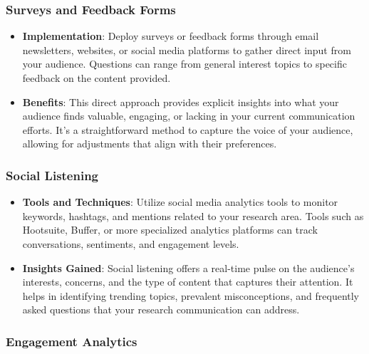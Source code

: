 \documentclass[
]{book}
\providecommand{\tightlist}{%
  \setlength{\itemsep}{0pt}\setlength{\parskip}{0pt}}
\begin{document}
\hypertarget{surveys-and-feedback-forms}{%
\subsubsection*{Surveys and Feedback Forms}\label{surveys-and-feedback-forms}}

\begin{itemize}
\tightlist
\item
  \textbf{Implementation}: Deploy surveys or feedback forms through email newsletters, websites, or social media platforms to gather direct input from your audience. Questions can range from general interest topics to specific feedback on the content provided.
\item
  \textbf{Benefits}: This direct approach provides explicit insights into what your audience finds valuable, engaging, or lacking in your current communication efforts. It's a straightforward method to capture the voice of your audience, allowing for adjustments that align with their preferences.
\end{itemize}

\hypertarget{social-listening}{%
\subsubsection*{Social Listening}\label{social-listening}}

\begin{itemize}
\tightlist
\item
  \textbf{Tools and Techniques}: Utilize social media analytics tools to monitor keywords, hashtags, and mentions related to your research area. Tools such as Hootsuite, Buffer, or more specialized analytics platforms can track conversations, sentiments, and engagement levels.
\item
  \textbf{Insights Gained}: Social listening offers a real-time pulse on the audience's interests, concerns, and the type of content that captures their attention. It helps in identifying trending topics, prevalent misconceptions, and frequently asked questions that your research communication can address.
\end{itemize}

\hypertarget{engagement-analytics}{%
\subsubsection*{Engagement Analytics}\label{engagement-analytics}}
\end{document}
